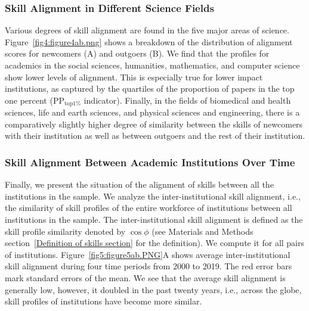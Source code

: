 \documentclass[draft,final]{vutinfth} %
\begin{document}
\subsubsection{Skill Alignment in Different Science Fields}
Various degrees of skill alignment are found in the five major areas of science. Figure~\ref{fig4:figure4ab.png} shows a breakdown of the distribution of alignment scores for newcomers (A) and outgoers (B). We find that the profiles for academics in the social sciences, humanities, mathematics, and computer science show lower levels of alignment. This is especially true for lower impact institutions, as captured by the quartiles of the proportion of papers in the top one percent (PP$_\mathrm{top1\%}$ indicator). Finally, in the fields of biomedical and health sciences, life and earth sciences, and physical sciences and engineering, there is a comparatively slightly higher degree of similarity between the skills of newcomers with their institution as well as between outgoers and the rest of their institution.

\subsubsection{Skill Alignment Between Academic Institutions Over Time}
Finally, we present the situation of the alignment of skills between all the institutions in the sample. We analyze the  inter-institutional skill alignment, i.e., the similarity of skill profiles of the entire workforce of institutions between all institutions in the sample. The inter-institutional skill alignment is defined as the skill profile similarity denoted by $\cos{\phi}$ (see Materials and Methods section~\ref{Definition of skills section} for the definition). We compute it for all pairs of institutions. Figure~\ref{fig5:figure5ab.PNG}A shows average inter-institutional skill alignment during four time periods from 2000 to 2019. The red error bars mark standard errors of the mean. We see that the average skill alignment is generally low, however, it doubled in the past twenty years, i.e., across the globe, skill profiles of institutions have become more similar. 
\end{document}
